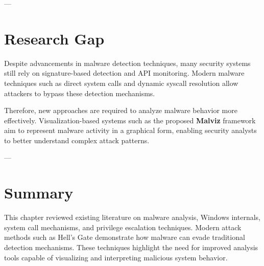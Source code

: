 ---

\section{Research Gap}

Despite advancements in malware detection techniques, many security systems still rely on signature-based detection 
and API monitoring. Modern malware techniques such as direct system calls and dynamic syscall resolution allow 
attackers to bypass these detection mechanisms.

Therefore, new approaches are required to analyze malware behavior more effectively. Visualization-based systems 
such as the proposed \textbf{Malviz} framework aim to represent malware activity in a graphical form, enabling 
security analysts to better understand complex attack patterns.

---

\section{Summary}

This chapter reviewed existing literature on malware analysis, Windows internals, system call mechanisms, and 
privilege escalation techniques. Modern attack methods such as Hell's Gate demonstrate how malware can evade 
traditional detection mechanisms. These techniques highlight the need for improved analysis tools capable of 
visualizing and interpreting malicious system behavior.







